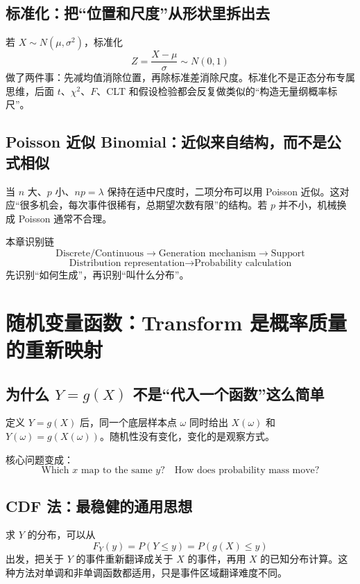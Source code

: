 \documentclass[11pt,a4paper,openany]{ctexbook}
\begin{document}
\section{标准化：把“位置和尺度”从形状里拆出去}
若 $X\sim N(\mu,\sigma^2)$，标准化
\[
Z=\frac{X-\mu}{\sigma}\sim N(0,1)
\]
做了两件事：先减均值消除位置，再除标准差消除尺度。标准化不是正态分布专属思维，后面 $t$、$\chi^2$、$F$、CLT 和假设检验都会反复做类似的“构造无量纲概率标尺”。

\section{Poisson 近似 Binomial：近似来自结构，而不是公式相似}
当 $n$ 大、$p$ 小、$np=\lambda$ 保持在适中尺度时，二项分布可以用 Poisson 近似。这对应“很多机会，每次事件很稀有，总期望次数有限”的结构。若 $p$ 并不小，机械换成 Poisson 通常不合理。

\begin{methodbox}{本章识别链}
\[
\boxed{\text{Discrete/Continuous}\to\text{Generation mechanism}\to\text{Support}}
\]
\[
\boxed{\text{Distribution representation}\to\text{Probability calculation}}
\]
先识别“如何生成”，再识别“叫什么分布”。
\end{methodbox}

\chapter{随机变量函数：Transform 是概率质量的重新映射}

\section{为什么 $Y=g(X)$ 不是“代入一个函数”这么简单}
定义 $Y=g(X)$ 后，同一个底层样本点 $\omega$ 同时给出 $X(\omega)$ 和 $Y(\omega)=g(X(\omega))$。随机性没有变化，变化的是观察方式。

核心问题变成：
\[
\boxed{\text{Which }x\text{ map to the same }y?\quad\text{How does probability mass move?}}
\]

\section{CDF 法：最稳健的通用思想}
求 $Y$ 的分布，可以从
\[
F_Y(y)=P(Y\le y)=P(g(X)\le y)
\]
出发，把关于 $Y$ 的事件重新翻译成关于 $X$ 的事件，再用 $X$ 的已知分布计算。这种方法对单调和非单调函数都适用，只是事件区域翻译难度不同。
\end{document}
